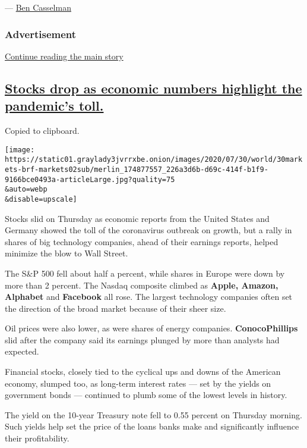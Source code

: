--- \href{https://www.nytimes3xbfgragh.onion/by/ben-casselman}{Ben
Casselman}

\hypertarget{advertisement-2}{%
\subsubsection{Advertisement}\label{advertisement-2}}

\protect\hyperlink{after-dfp-ad-mid3}{Continue reading the main story}

\hypertarget{stocks-drop-as-economic-numbers-highlight-the-pandemics-toll}{%
\subsection{\texorpdfstring{\protect\hyperlink{stocks-drop-as-economic-numbers-highlight-the-pandemics-toll}{Stocks
drop as economic numbers highlight the pandemic's
toll.}}{Stocks drop as economic numbers highlight the pandemic's toll.}}\label{stocks-drop-as-economic-numbers-highlight-the-pandemics-toll}}

Copied to clipboard.

\texttt{[image: https://static01.graylady3jvrrxbe.onion/images/2020/07/30/world/30markets-brf-markets02sub/merlin\_174877557\_226a3d6b-d69c-414f-b1f9-9166bce0493a-articleLarge.jpg?quality=75\\\&auto=webp\\\&disable=upscale]}

Stocks slid on Thursday as economic reports from the United States and
Germany showed the toll of the coronavirus outbreak on growth, but a
rally in shares of big technology companies, ahead of their earnings
reports, helped minimize the blow to Wall Street.

The S\&P 500 fell about half a percent, while shares in Europe were down
by more than 2 percent. The Nasdaq composite climbed as \textbf{Apple,
Amazon, Alphabet} and \textbf{Facebook} all rose. The largest technology
companies often set the direction of the broad market because of their
sheer size.

Oil prices were also lower, as were shares of energy companies.
\textbf{ConocoPhillips} slid after the company said its earnings plunged
by more than analysts had expected.

Financial stocks, closely tied to the cyclical ups and downs of the
American economy, slumped too, as long-term interest rates --- set by
the yields on government bonds --- continued to plumb some of the lowest
levels in history.

The yield on the 10-year Treasury note fell to 0.55 percent on Thursday
morning. Such yields help set the price of the loans banks make and
significantly influence their profitability.

